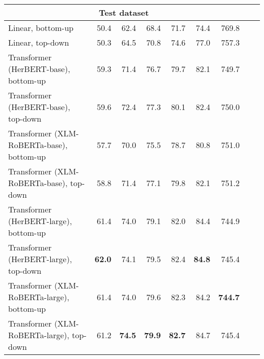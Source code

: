 \begin{table}[ht!]
{\begin{tabular}{lrrrrrrrr}
   \hline \multicolumn{7}{c}{\textbf{Test dataset}} \\ \hline
Linear, bottom-up & 50.4 & 62.4 & 68.4 & 71.7 & 74.4 & 769.8 \\ 
  Linear, top-down & 50.3 & 64.5 & 70.8 & 74.6 & 77.0 & 757.3 \\ 
  Transformer (HerBERT-base), bottom-up & 59.3 & 71.4 & 76.7 & 79.7 & 82.1 & 749.7 \\ 
  Transformer (HerBERT-base), top-down & 59.6 & 72.4 & 77.3 & 80.1 & 82.4 & 750.0 \\ 
  Transformer (XLM-RoBERTa-base), bottom-up & 57.7 & 70.0 & 75.5 & 78.7 & 80.8 & 751.0 \\ 
  Transformer (XLM-RoBERTa-base), top-down & 58.8 & 71.4 & 77.1 & 79.8 & 82.1 & 751.2 \\ 
  Transformer (HerBERT-large), bottom-up & 61.4 & 74.0 & 79.1 & 82.0 & 84.4 & 744.9 \\ 
  Transformer (HerBERT-large), top-down & \textbf{62.0} & 74.1 & 79.5 & 82.4 & \textbf{84.8} & 745.4 \\ 
  Transformer (XLM-RoBERTa-large), bottom-up & 61.4 & 74.0 & 79.6 & 82.3 & 84.2 & \textbf{744.7} \\ 
  Transformer (XLM-RoBERTa-large), top-down & 61.2 & \textbf{74.5} & \textbf{79.9} & \textbf{82.7} & 84.7 & 745.4 \\ 
   \hline
\end{tabular}
}
\end{table}




